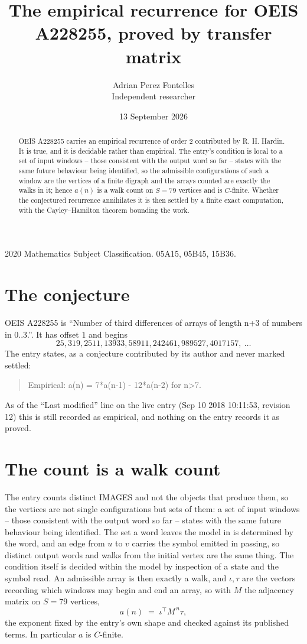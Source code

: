 \documentclass[11pt,a4paper]{article}
\title{The empirical recurrence for OEIS A228255, proved by transfer matrix}
\author{Adrian Perez Fontelles\\ \small Independent researcher}
\date{13 September 2026}
\theoremstyle{plain}
\theoremstyle{definition}
\begin{document}
\maketitle

\begin{abstract}
OEIS A228255 carries an empirical recurrence of order $2$ contributed by R. H. Hardin. It is
true, and it is decidable rather than empirical. The entry's condition is local to a set of input windows -- those consistent with the output word so far -- states with the same future behaviour being identified, so
the admissible configurations of such a window are the vertices of a finite digraph and the
arrays counted are exactly the walks in it; hence $a(n)$ is a walk count on $S=79$ vertices
and is $C$-finite. Whether the conjectured recurrence annihilates it is then settled by a
finite exact computation, with the Cayley--Hamilton theorem bounding the work.
\end{abstract}

\noindent\small 2020 Mathematics Subject Classification. 05A15, 05B45, 15B36.\normalsize

\section{The conjecture}

OEIS A228255 is ``Number of third differences of arrays of length n+3 of numbers in 0..3.''. It has offset $1$ and begins
\[
25, 319, 2511, 13933, 58911, 242461, 989527, 4017157,\ \dots
\]
The entry states, as a conjecture contributed by its author and never marked settled:
\begin{quote}
Empirical: a(n) = 7*a(n-1) - 12*a(n-2) for n>7.
\end{quote}
As of the ``Last modified'' line on the live entry (Sep 10 2018 10:11:53, revision 12) this is still
recorded as empirical, and nothing on the entry records it as proved.

\section{The count is a walk count}

The entry counts distinct IMAGES and not the objects that produce them, so the vertices are not single configurations but sets of them: a set of input windows -- those consistent with the output word so far -- states with the same future behaviour being identified. The set a word leaves the model in is determined by the word, and an edge from $u$ to $v$ carries the symbol emitted in passing, so distinct output words and walks from the initial vertex are the same thing. The condition itself is decided within the model by inspection of a state and the symbol read.
An admissible array is then exactly a walk, and $\iota,\tau$ are the vectors recording which windows may begin and end an array, so with $M$ the adjacency matrix on $S=79$ vertices,
\[
a(n)\;=\;\iota^{\!\top}M^{\,n}\tau ,
\]
the exponent fixed by the entry's own shape and checked against its published terms. In
particular $a$ is $C$-finite.
\end{document}

